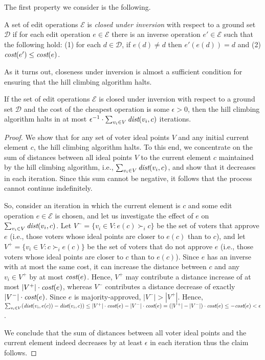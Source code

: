 \documentclass[sigconf]{aamas}  %
\newcommand{\calD}{\mathcal{D}}
\newcommand{\calE}{\mathcal{E}}
\newcommand{\prefers}[1]{\succ_{#1}}
\newcommand{\dist}{\emph{dist}}
\newcommand{\cost}{\emph{cost}}
\begin{document}
The first property we consider is the following.

\begin{definition}
%
A set of edit operations $\calE$ is \emph{closed under inversion} with respect to a ground set $\calD$ if for each edit operation $e \in \calE$ there is an inverse operation $e' \in \calE$
such that the following hold:
  (1) for each $d \in \calD$, if $e(d) \neq d$ then $e'(e(d)) = d$
  and
  (2) $\cost(e') \leq \cost(e)$.
%
\end{definition}

As it turns out, closeness under inversion is almost a sufficient condition for ensuring that the hill climbing algorithm halts.

\begin{lemma}\label{lemma:stops}
If the set of edit operations $\calE$ is closed under inversion with respect to a ground set $\calD$ and the cost of the cheapest operation is some $\epsilon > 0$,
then the hill climbing algorithm halts in at most $\epsilon^{-1} \cdot \sum_{v_i \in V} \dist(v_i, c)$ iterations.
\end{lemma}

\begin{proof}
%
We show that for any set of voter ideal points $V$ and any initial current element $c$, the hill climbing algorithm halts.
To this end, we concentrate on the sum of distances between all ideal points $V$ to the current element $c$ maintained by the hill climbing algorithm, i.e., $\sum_{v_i \in V} \dist(v_i, c)$,
and show that it decreases in each iteration. Since this sum cannot be negative, it follows that the process cannot continue indefinitely.

So,
consider an iteration in which the current element is $c$ and some edit operation $e \in \calE$ is chosen, and let us investigate the effect of $e$ on $\sum_{v_i \in V} \dist(v_i, c)$.
Let $V^- = \{v_i \in V : e(c) \prefers{i} c\}$ be the set of voters that approve $e$ (i.e., those voters whose ideal points are closer to $e(c)$ than to $c$),
and let $V^+ = \{v_i \in V : c \prefers{i} e(c)\}$ be the set of voters that do not approve $e$ (i.e., those voters whose ideal points are closer to $c$ than to $e(c)$).
Since $e$ has an inverse with at most the same cost, it can increase the distance between $c$ and any $v_i \in V^+$ by at most $\cost(e)$.
Hence,  $V^+$ may contribute a distance increase of at most $|V^+| \cdot \cost(e)$, whereas  $V^-$ contributes a distance decrease of exactly $|V^-| \cdot \cost(e)$. 
Since $e$ is majority-approved, $|V^-| > |V^+|$.
Hence, $\sum_{v_i \in V} (\dist(v_i, e(c)) - \dist(v_i,c)) \leq |V^+| \cdot \cost(e) -  |V^-| \cdot \cost(e)  = (|V^+| - |V^-|) \cdot \cost(e) \le  -\cost(e) < \epsilon$.

We conclude that the sum of distances between all voter ideal points and the current element indeed decreases by at least $\epsilon$ in each iteration thus the claim follows.
%
\end{proof}
\end{document}
